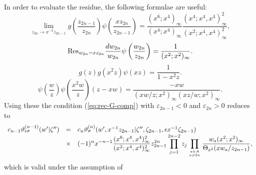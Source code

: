 \documentclass[a4paper,10pt]{article}
\begin{document}
In order to evaluate the residue, the following formulae 
are useful: 
\begin{equation}
\lim_{z_{2n}\rightarrow x^{-2}z_{2n-1}} 
g\left( \frac{z_{2n-1}}{z_{2n}} \right) 
\psi \left( \frac{xz_{2n}}{z_{2n-1}} \right) 
= \frac{(x^6; x^4)_\infty}{(x^4; x^4)_\infty}
\frac{(x^4; x^4 , x^4)^2_\infty}
{(x^2; x^4 , x^4)^2_\infty}, 
\label{eq:lim_z}
\end{equation}
\begin{equation}
{\rm Res}_{w_{2n}=xz_{2n}}\frac{dw_{2n}}{w_{2n}}
\psi \left( \frac{w_{2n}}{z_{2n}} \right) 
=\frac{1}{(x^2; x^2 )_\infty}. 
\label{eq:Res_w}
\end{equation}
\begin{equation}
g(z)g(x^2 z)\psi (xz)=\frac{1}{1-x^2 z}. 
\label{eq:ggpsi_j}
\end{equation}
\begin{equation}
\psi \left( \frac{w}{z} \right) 
\psi \left( \frac{x^2 w}{z} \right) 
(z-xw) =\frac{-xw}
{(xw/z; x^2)_\infty(xz/w; x^2)_\infty}. 
\label{eq:ppQ_a}
\end{equation}
Using these the condition (\ref{eq:rec-G-comp}) 
with $\varepsilon_{2n-1}<0$ and 
$\varepsilon_{2n}>0$ reduces to 
$$
\begin{array}{rcl}
c_{n-1} \vartheta_{\epsilon\sigma}^{(n-1)}(w'|\zeta'')
&=&c_n \vartheta_\sigma^{(n)}(w', x^{-1}z_{2n-1}|
\zeta'', \zeta_{2n-1}, \epsilon x^{-1}\zeta_{2n-1}) \\
&\times& \displaystyle (-1)^n x^{-n-1} 
\frac{(x^8; x^4 , x^4)^2_\infty}
{(x^2; x^4 , x^4)^2_\infty} z_{2n-1}^{2n} 
\prod_{j=1}^{2n-2} z_j 
\prod_{a\in A\atop a\neq 2n} 
\frac{w_a (x^2; x^2 )_\infty}
{\Theta_{x^2}(xw_a /z_{2n-1})}, 
\end{array}
$$
which is valid under the assumption of 
\end{document}
